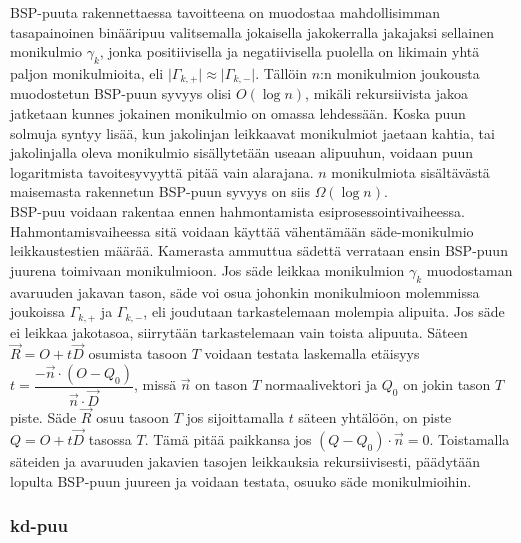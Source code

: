 ﻿\documentclass[a4paper, 12pt, titlepage]{article}
\newcommand{\abs}[1]{\vert #1 \vert} %
\begin{document}
BSP-puuta rakennettaessa tavoitteena on muodostaa mahdollisimman tasapainoinen binääripuu valitsemalla jokaisella jakokerralla jakajaksi sellainen monikulmio $\gamma_k$, jonka positiivisella ja negatiivisella puolella on likimain yhtä paljon monikulmioita, eli $\abs{\Gamma_{k,+}} \approx \abs{\Gamma_{k,-}}$. Tällöin  $n$:n monikulmion joukousta muodostetun BSP-puun syvyys olisi $O(\log n)$, mikäli rekursiivista jakoa jatketaan kunnes jokainen monikulmio on omassa lehdessään. Koska puun solmuja syntyy lisää, kun jakolinjan leikkaavat monikulmiot jaetaan kahtia, tai jakolinjalla oleva monikulmio sisällytetään useaan alipuuhun, voidaan puun logaritmista tavoitesyvyyttä pitää vain alarajana. \citep[.]{hughes} $n$ monikulmiota sisältävästä maisemasta rakennetun BSP-puun syvyys on siis $\Omega(\log n)$.\\



BSP-puu voidaan rakentaa ennen hahmontamista esiprosessointivaiheessa. Hahmontamisvaiheessa sitä voidaan käyttää vähentämään säde-monikulmio leikkaustestien määrää. Kamerasta ammuttua sädettä verrataan ensin BSP-puun juurena toimivaan monikulmioon. Jos säde leikkaa monikulmion $\gamma_k$ muodostaman avaruuden jakavan tason, säde voi osua johonkin monikulmioon molemmissa joukoissa ${\Gamma_{k,+}}$ ja ${\Gamma_{k,-}}$, eli joudutaan tarkastelemaan molempia alipuita. Jos säde ei leikkaa jakotasoa, siirrytään tarkastelemaan vain toista alipuuta. Säteen $\vec{R}=O+t\vec{D}$ osumista tasoon $T$ voidaan testata laskemalla etäisyys $t=\dfrac{-\vec{n}\cdot(O-Q_0)}{\vec{n}\cdot\vec{D}}$, missä $\vec{n}$ on tason $T$ normaalivektori ja $Q_0$ on jokin tason $T$ piste. Säde $\vec{R}$ osuu tasoon $T$ jos sijoittamalla $t$ säteen yhtälöön, on piste $Q = O+t\vec{D}$ tasossa $T$. Tämä pitää paikkansa jos $(Q-Q_0)\cdot\vec{n} = 0$. \citep[.]{hughes} Toistamalla säteiden ja avaruuden jakavien tasojen leikkauksia rekursiivisesti, päädytään lopulta BSP-puun juureen ja voidaan testata, osuuko säde monikulmioihin. \citep[.]{ranta}\\

\subsubsection{kd-puu}
\end{document}
